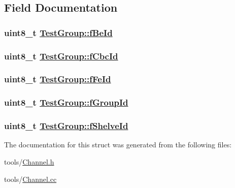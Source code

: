 \subsection{Field Documentation}
\hypertarget{struct_test_group_220aae8ee3ae8c357f1787e3625431b4}{
\subsubsection[fBeId]{\setlength{\rightskip}{0pt plus 5cm}uint8\_\-t \hyperlink{struct_test_group_220aae8ee3ae8c357f1787e3625431b4}{Test\-Group::f\-Be\-Id}}}
\label{struct_test_group_220aae8ee3ae8c357f1787e3625431b4}


\hypertarget{struct_test_group_c29315115540d3e0fc74b2dba3771162}{
\subsubsection[fCbcId]{\setlength{\rightskip}{0pt plus 5cm}uint8\_\-t \hyperlink{struct_test_group_c29315115540d3e0fc74b2dba3771162}{Test\-Group::f\-Cbc\-Id}}}
\label{struct_test_group_c29315115540d3e0fc74b2dba3771162}


\hypertarget{struct_test_group_0eaafe2a6411b3865c90240b36b24840}{
\subsubsection[fFeId]{\setlength{\rightskip}{0pt plus 5cm}uint8\_\-t \hyperlink{struct_test_group_0eaafe2a6411b3865c90240b36b24840}{Test\-Group::f\-Fe\-Id}}}
\label{struct_test_group_0eaafe2a6411b3865c90240b36b24840}


\hypertarget{struct_test_group_425092488cd04f3f22fdf8dfe0e877ed}{
\subsubsection[fGroupId]{\setlength{\rightskip}{0pt plus 5cm}uint8\_\-t \hyperlink{struct_test_group_425092488cd04f3f22fdf8dfe0e877ed}{Test\-Group::f\-Group\-Id}}}
\label{struct_test_group_425092488cd04f3f22fdf8dfe0e877ed}


\hypertarget{struct_test_group_1e7aaad7924e3eae8d381adee67173d0}{
\subsubsection[fShelveId]{\setlength{\rightskip}{0pt plus 5cm}uint8\_\-t \hyperlink{struct_test_group_1e7aaad7924e3eae8d381adee67173d0}{Test\-Group::f\-Shelve\-Id}}}
\label{struct_test_group_1e7aaad7924e3eae8d381adee67173d0}




The documentation for this struct was generated from the following files:\begin{CompactItemize}
\item 
tools/\hyperlink{_channel_8h}{Channel.h}\item 
tools/\hyperlink{_channel_8cc}{Channel.cc}\end{CompactItemize}
